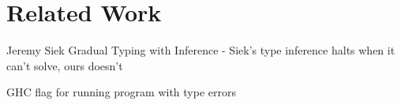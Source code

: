 \section{Related Work}
\label{sec:related}

Jeremy Siek Gradual Typing with Inference
- Siek's type inference halts when it can't solve, ours doesn't

GHC flag for running program with type errors